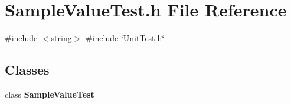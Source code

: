 \section{Sample\+Value\+Test.\+h File Reference}
\label{SampleValueTest_8h}
{\ttfamily \#include $<$string$>$}\newline
{\ttfamily \#include \char`\"{}Unit\+Test.\+h\char`\"{}}\newline
\subsection*{Classes}
\begin{DoxyCompactItemize}
\item 
class \textbf{ Sample\+Value\+Test}
\end{DoxyCompactItemize}
